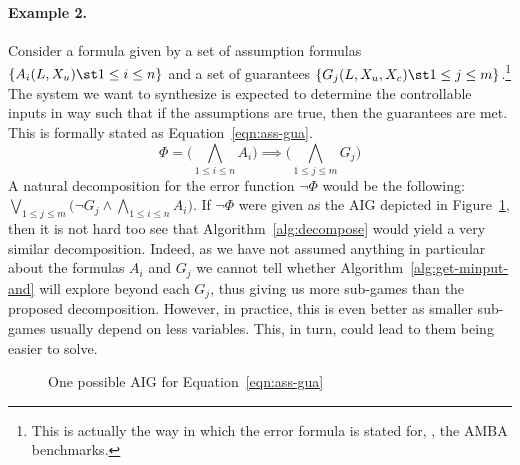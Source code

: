 \documentclass[submission,copyright,creativecommons]{eptcs}
\begin{document}
\paragraph{Example 2.} Consider a formula given by a set of assumption
formulas $\{A_i(L,X_u) \st 1 \le i \le n\}$ and a set of guarantees 
$\{G_j(L,X_u,X_c) \st 1 \le j\le m\}$.\footnote{This is actually the way in
	which the error formula is stated for, \eg, the \textsf{AMBA}
	benchmarks.}
The system we want to synthesize is expected to determine the
controllable inputs in way such that if the assumptions are true, then the
guarantees are met. This is formally stated as Equation~\ref{eqn:ass-gua}.
\begin{equation}\label{eqn:ass-gua}
	\Phi = \big(\bigwedge_{1 \le i \le n} A_i\big) \implies
	\big( \bigwedge_{1 \le j \le m} G_j \big)
\end{equation}
A natural decomposition for the error function $\lnot \Phi$ would be the
following: $\bigvee_{1 \le j \le m} \big(\lnot G_j \land \bigwedge_{1 \le i \le
n} A_i \big)$.  If $\lnot \Phi$ were given as the AIG depicted in
Figure~\ref{fig:example-aig-2}, then it is not hard too see that
Algorithm~\ref{alg:decompose} would yield a very similar
decomposition.
Indeed, as we have not assumed anything in particular about the formulas $A_i$
and $G_j$ we cannot tell whether Algorithm~\ref{alg:get-minput-and} will explore
beyond each $G_j$, thus giving us more sub-games than the proposed
decomposition.  However, in practice, this is even better as smaller sub-games
usually depend on less variables. This, in turn, could lead to them being easier
to solve. 


\begin{figure}
\centering
{}
\caption{One possible AIG for Equation~\ref{eqn:ass-gua}}
\label{fig:example-aig-2}
\end{figure}
\end{document}
